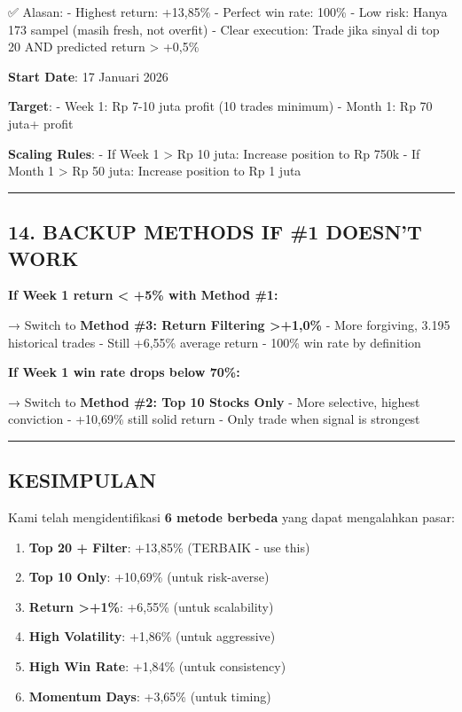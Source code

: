 \documentclass[
  10pt,
  a4paper,
]{article}
\providecommand{\tightlist}{%
  \setlength{\itemsep}{0pt}\setlength{\parskip}{0pt}}\usepackage{longtable,booktabs,array}
\begin{document}
✅ Alasan: - Highest return: +13,85\% - Perfect win rate: 100\% - Low
risk: Hanya 173 sampel (masih fresh, not overfit) - Clear execution:
Trade jika sinyal di top 20 AND predicted return \textgreater{} +0,5\%

\textbf{Start Date}: 17 Januari 2026

\textbf{Target}: - Week 1: Rp 7-10 juta profit (10 trades minimum) -
Month 1: Rp 70 juta+ profit

\textbf{Scaling Rules}: - If Week 1 \textgreater{} Rp 10 juta: Increase
position to Rp 750k - If Month 1 \textgreater{} Rp 50 juta: Increase
position to Rp 1 juta

\begin{center}\rule{0.5\linewidth}{0.5pt}\end{center}

\subsection{14. BACKUP METHODS IF \#1 DOESN'T
WORK}\label{backup-methods-if-1-doesnt-work}

\textbf{If Week 1 return \textless{} +5\% with Method \#1:}

→ Switch to \textbf{Method \#3: Return Filtering \textgreater+1,0\%} -
More forgiving, 3.195 historical trades - Still +6,55\% average return -
100\% win rate by definition

\textbf{If Week 1 win rate drops below 70\%:}

→ Switch to \textbf{Method \#2: Top 10 Stocks Only} - More selective,
highest conviction - +10,69\% still solid return - Only trade when
signal is strongest

\begin{center}\rule{0.5\linewidth}{0.5pt}\end{center}

\subsection{KESIMPULAN}\label{kesimpulan}

Kami telah mengidentifikasi \textbf{6 metode berbeda} yang dapat
mengalahkan pasar:

\begin{enumerate}
\def\labelenumi{\arabic{enumi}.}
\tightlist
\item
  \textbf{Top 20 + Filter}: +13,85\% (TERBAIK - use this)
\item
  \textbf{Top 10 Only}: +10,69\% (untuk risk-averse)
\item
  \textbf{Return \textgreater+1\%}: +6,55\% (untuk scalability)
\item
  \textbf{High Volatility}: +1,86\% (untuk aggressive)
\item
  \textbf{High Win Rate}: +1,84\% (untuk consistency)
\item
  \textbf{Momentum Days}: +3,65\% (untuk timing)
\end{enumerate}
\end{document}
